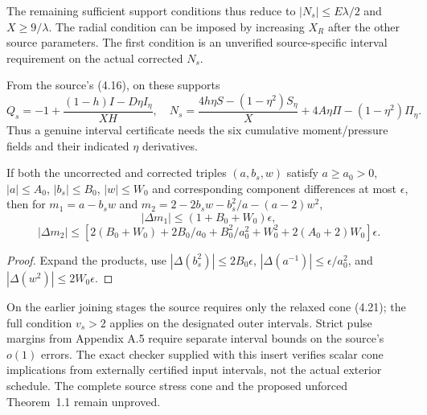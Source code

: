 The remaining sufficient support conditions thus reduce to
$|N_s|\le E\lambda/2$ and $X\ge9/\lambda$.
The radial condition can be imposed by increasing $X_R$
after the other source parameters. The first condition is an
unverified source-specific interval requirement on the actual
corrected $N_s$.

From the source's (4.16), on these supports
\[
Q_s=-1+\frac{(1-h)I-D\eta I_\eta}{XH},\quad
N_s=\frac{4h\eta S-(1-\eta^2)S_\eta}{X}
 +4A\eta\Pi-(1-\eta^2)\Pi_\eta .
\]
Thus a genuine interval certificate needs the six cumulative
moment/pressure fields and their indicated $\eta$ derivatives.

\begin{lemma}
If both the uncorrected and corrected triples $(a,b_s,w)$
satisfy $a\ge a_0>0$, $|a|\le A_0$, $|b_s|\le B_0$,
$|w|\le W_0$ and corresponding component differences
at most $\epsilon$, then for
$m_1=a-b_sw$ and
$m_2=2-2b_sw-b_s^2/a-(a-2)w^2$,
\[
|\Delta m_1|\le(1+B_0+W_0)\epsilon,
\]
\[
|\Delta m_2|\le
\left[2(B_0+W_0)+2B_0/a_0+B_0^2/a_0^2+
W_0^2+2(A_0+2)W_0\right]\epsilon.
\]
\end{lemma}
\begin{proof}
Expand the products, use
$|\Delta(b_s^2)|\le2B_0\epsilon$,
$|\Delta(a^{-1})|\le\epsilon/a_0^2$, and
$|\Delta(w^2)|\le2W_0\epsilon$.
\end{proof}

On the earlier joining stages the source requires only the
relaxed cone (4.21); the full condition $v_s>2$ applies on
the designated outer intervals. Strict pulse margins from
Appendix A.5 require separate interval bounds on the
source's $o(1)$ errors. The exact checker supplied with this
insert verifies scalar cone implications from externally
certified input intervals, not the actual exterior schedule.
The complete source stress cone and the proposed unforced
Theorem~1.1 remain unproved.

